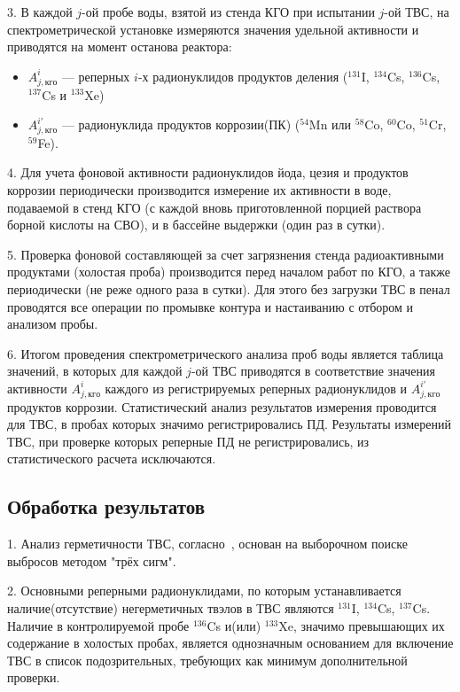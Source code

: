 3. В каждой $j$-ой пробе воды, взятой из стенда КГО при испытании $j$-ой ТВС, на спектрометрической установке измеряются значения удельной активности и приводятся на момент останова реактора:
\begin{itemize}
\item $A_{j,кго}^{i}$ --- реперных $i$-х радионуклидов продуктов деления ($^{131}$I, $^{134}$Cs, $^{136}$Cs, $^{137}$Cs и $^{133}$Xe)

\item $A_{j,кго}^{i'}$ --- радионуклида продуктов коррозии(ПК) ($^{54}$Mn или $^{58}$Co, $^{60}$Co, $^{51}$Cr, $^{59}$Fe).
\end{itemize}

4. Для учета фоновой активности радионуклидов йода, цезия и
продуктов коррозии периодически производится измерение их активности
в воде, подаваемой в стенд КГО (с каждой вновь приготовленной порцией
раствора борной кислоты на СВО), и в бассейне выдержки (один раз в
сутки).

5. Проверка фоновой составляющей за счет загрязнения стенда
радиоактивными продуктами (холостая проба) производится перед началом
работ по КГО, а также периодически (не реже одного раза в сутки). Для этого
без загрузки ТВС в пенал проводятся все операции по промывке контура и
настаиванию с отбором и анализом пробы.

6. Итогом проведения спектрометрического анализа проб воды является
таблица значений, в которых для каждой $j$-ой ТВС приводятся в соответствие
значения активности $A_{j,кго}^{i}$ каждого из регистрируемых реперных радионуклидов
и $A_{j,кго}^{i'}$ продуктов коррозии. Статистический анализ результатов
измерения проводится для ТВС, в пробах которых значимо регистрировались
ПД. Результаты измерений ТВС, при проверке которых реперные ПД не
регистрировались, из статистического расчета исключаются.

\subsection{Обработка результатов}
1. Анализ герметичности ТВС, согласно~\cite{RD}, основан на выборочном поиске выбросов методом "трёх сигм".

2. Основными реперными радионуклидами, по которым устанавливается наличие(отсутствие) негерметичных твэлов в ТВС являются $^{131}$I, $^{134}$Cs, $^{137}$Cs. Наличие в контролируемой пробе $^{136}$Cs и(или) $^{133}$Xe, значимо превышающих их содержание в холостых пробах, является однозначным основанием для включение ТВС в список подозрительных, требующих как минимум дополнительной проверки.

